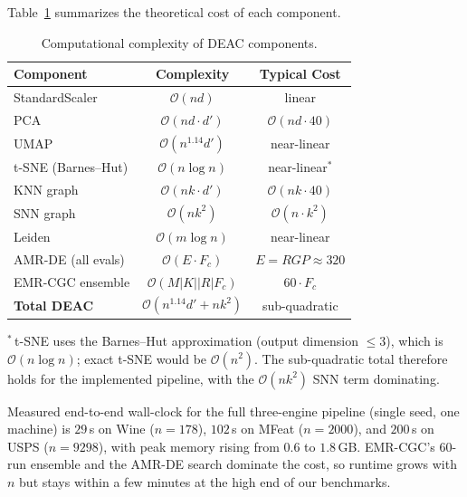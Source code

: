 \documentclass[journal]{IEEEtran}
\begin{document}
Table~\ref{tab:complexity} summarizes the theoretical cost of each component.

\begin{table}[htbp]
\centering
\caption{Computational complexity of DEAC components.}
\label{tab:complexity}
\footnotesize
\setlength{\tabcolsep}{3pt}
\begin{tabular}{lcc}
\toprule
Component & Complexity & Typical Cost \\
\midrule
StandardScaler        & $\mathcal{O}(nd)$                   & linear \\
PCA                   & $\mathcal{O}(nd \cdot d')$          & $\mathcal{O}(nd \cdot 40)$ \\
UMAP                  & $\mathcal{O}(n^{1.14} d')$          & near-linear \\
t-SNE (Barnes--Hut)   & $\mathcal{O}(n \log n)$             & near-linear$^\ast$ \\
KNN graph             & $\mathcal{O}(nk \cdot d')$          & $\mathcal{O}(nk \cdot 40)$ \\
SNN graph             & $\mathcal{O}(nk^2)$                 & $\mathcal{O}(n \cdot k^2)$ \\
Leiden                & $\mathcal{O}(m \log n)$             & near-linear \\
AMR-DE (all evals)    & $\mathcal{O}(E \cdot F_c)$          & $E{=}RGP{\approx}320$ \\
EMR-CGC ensemble      & $\mathcal{O}(M|K||R| F_c)$          & $60 \cdot F_c$ \\
\midrule
\textbf{Total DEAC}   & $\mathcal{O}(n^{1.14} d' + n k^2)$  & sub-quadratic \\
\bottomrule
\end{tabular}

\vspace{2pt}
{\footnotesize $^\ast$\,t-SNE uses the Barnes--Hut approximation (output dimension ${\le}3$), which is $\mathcal{O}(n\log n)$; exact t-SNE would be $\mathcal{O}(n^2)$. The sub-quadratic total therefore holds for the implemented pipeline, with the $\mathcal{O}(nk^2)$ SNN term dominating.}
\end{table}

Measured end-to-end wall-clock for the full three-engine pipeline (single seed, one machine) is $29$\,s on Wine ($n{=}178$), $102$\,s on MFeat ($n{=}2000$), and $200$\,s on USPS ($n{=}9298$), with peak memory rising from $0.6$ to $1.8$\,GB. EMR-CGC's 60-run ensemble and the AMR-DE search dominate the cost, so runtime grows with $n$ but stays within a few minutes at the high end of our benchmarks.
\end{document}
